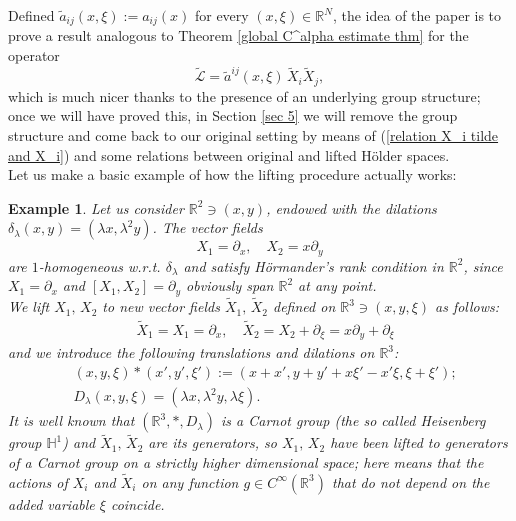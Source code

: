 \documentclass{article}
\newtheorem{example}[theorem]{Example}
\numberwithin{equation}{section}
\begin{document}
    \vspace{2mm}

Defined $\widetilde{a}_{ij}(x,\xi):=a_{ij}(x)$ for every $(x,\xi) \in \mathbb{R}^N$, the idea of the paper is to prove a result analogous to Theorem \ref{global C^alpha estimate thm} for the  operator
\begin{equation}
\label{def L tilde}
    \mathcal{\widetilde{L}} = \widetilde{a}^{ij}(x,\xi) \, \widetilde{X}_i \widetilde{X}_j,
\end{equation}
which is much nicer thanks to the presence of an underlying group structure; once we will have proved this, in Section \ref{sec 5} we will remove the group structure and come back to our original setting by means of (\ref{relation X_i tilde and X_i}) and some relations between original and lifted Hölder spaces.
\\Let us make a basic example of how the lifting procedure actually works:

\vspace{2mm}

\begin{example}
    Let us consider $\mathbb{R}^2 \ni (x,y)$, endowed with the dilations $\delta_{\lambda}(x,y)=(\lambda x, \lambda^2 y)$. The vector fields
    \begin{equation*}
        X_1 = \partial_x, \quad X_2 = x \partial_y
    \end{equation*}
    are $1$-homogeneous w.r.t. $\delta_{\lambda}$ and satisfy Hörmander's rank condition in $\mathbb{R}^2$, since $X_1=\partial_x$ and $[X_1,X_2]=\partial_y$ obviously span $\mathbb{R}^2$ at any point.\\
    We lift $X_1, \, X_2$ to new vector fields $\widetilde{X}_1, \, \widetilde{X}_2$ defined on $\mathbb{R}^3 \ni (x,y,\xi)$ as follows:
    \begin{align*}
        & \widetilde{X}_1=X_1=\partial_x, \quad \widetilde{X}_2=X_2+\partial_{\xi} = x \partial_y + \partial_{\xi}
    \end{align*}
    and we introduce the following translations and dilations on $\mathbb{R}^3$:
    \begin{align*}
        & (x,y,\xi)*(x',y',\xi'):=(x+x', y+y'+x\xi'-x'\xi,\xi+\xi');\\
        & D_{\lambda}(x,y,\xi)=(\lambda x, \lambda^2 y, \lambda \xi).
    \end{align*}
    It is well known that $(\mathbb{R}^3, *, D_{\lambda})$ is a Carnot group (the so called \emph{Heisenberg group} $\mathbb{H}^1$) and $\widetilde{X}_1, \, \widetilde{X}_2$ are its generators, so $X_1, \, X_2$ have been lifted to generators of a Carnot group on a strictly higher dimensional space; here  means that the actions of $X_i$ and $\widetilde{X}_i$ on any function $g \in C^{\infty}(\mathbb{R}^3)$ that do not depend on the added variable $\xi$ coincide.
\end{example}
\end{document}
